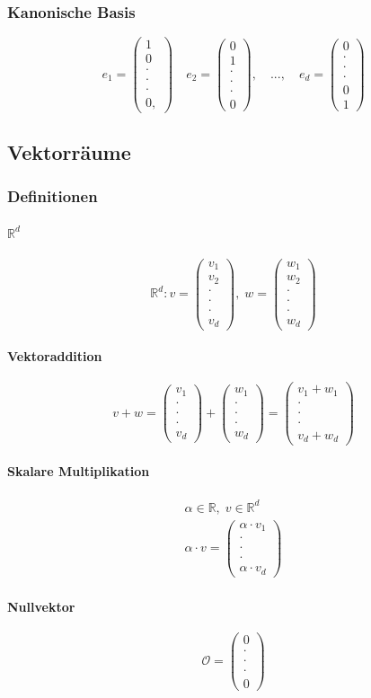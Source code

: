 \documentclass[12pt,a4paper]{report}%
\numberwithin{equation}{section}
\newcommand{\R}{\mathbb{R}} %
\newcommand{\subsubsubsection}{\paragraph}
\def\vecT#1{\left(\begin{array}{c} #1 \end{array}\right)}
\def\dddot{\cdot \\ \cdot \\ \cdot}
\def\vecD#1{\vecT{#1_1 \\ \dddot \\ #1_d}}
\numberwithin{equation}{subsection}
\begin{document}
  \subsubsection{Kanonische Basis}
  \begin{equation}
    e_1 = \vecT{1\\0\\ \dddot \\ 0,} \quad e_2 = \vecT{0\\1\\ \dddot \\ 0}, \quad ..., \quad e_d = \vecT{0\\ \dddot \\0 \\1}
  \end{equation}
	\subsection{Vektorräume}
		\subsubsection{Definitionen}
		\subsubsubsection{$\R^d$}
		\begin{equation}
			\R^d: v = \vecT{v_1\\v_2\\ \dddot \\v_d},\; w = \vecT{w_1\\w_2\\ \dddot \\ w_d}
		\end{equation}	
		\subsubsubsection{Vektoraddition}
		\begin{equation}
			v + w = \vecD{v} + \vecD{w} = \vecT{v_1 + w_1 \\ \dddot \\ v_d + w_d}
		\end{equation}
		\subsubsubsection{Skalare Multiplikation}
		\begin{align}
			\alpha \in \R, \; v \in \R^d \nonumber \\
			\alpha \cdot v = \vecD{\alpha\cdot v}
		\end{align}
		\subsubsubsection{Nullvektor}
		\begin{equation}
		  \mathcal{O} = \vecT{0 \\ \dddot \\ 0}
    \end{equation}		
    
\end{document}
